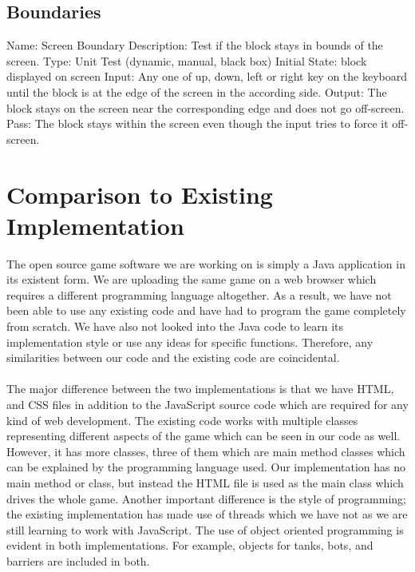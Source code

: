 \documentclass{article}
\begin{document}
\subsection{Boundaries}
Name: Screen Boundary\newline
Description: Test if the block stays in bounds of the screen.\newline
Type: Unit Test (dynamic, manual, black box)\newline
Initial State: block displayed on screen\newline
Input: Any one of up, down, left or right key on the keyboard until the block 
is at the edge of the screen in the according side.\newline
Output: The block stays on the screen near the corresponding edge and does not 
go off-screen.\newline
Pass: The block stays within the screen even though the input tries to force 
it off-screen.




\section{Comparison to Existing Implementation}
The open source game software we are working on is simply a Java application 
in its existent form. We are uploading the same game on a web browser which 
requires a different programming language altogether. As a result, we have not 
been able to use any existing code and have had to program the game completely 
from scratch. We have also not looked into the Java code to learn its 
implementation style or use any ideas for specific functions. Therefore, any 
similarities between our code and the existing code are coincidental. \\ \\
The major difference between the two implementations is that we have HTML, and 
CSS files in addition to the JavaScript source code which are required for any 
kind of web development. The existing code works with multiple classes 
representing different aspects of the game which can be seen in our code as 
well. However, it has more classes, three of them which are main method 
classes which can be explained by the programming language used. Our 
implementation has no main method or class, but instead the HTML file is used 
as the main class which drives the whole game. Another important difference is 
the style of programming; the existing implementation has made use of threads 
which we have not as we are still learning to work with JavaScript. The use of 
object oriented programming is evident in both implementations. For example, 
objects for tanks, bots, and barriers are included in both. 
\end{document}
